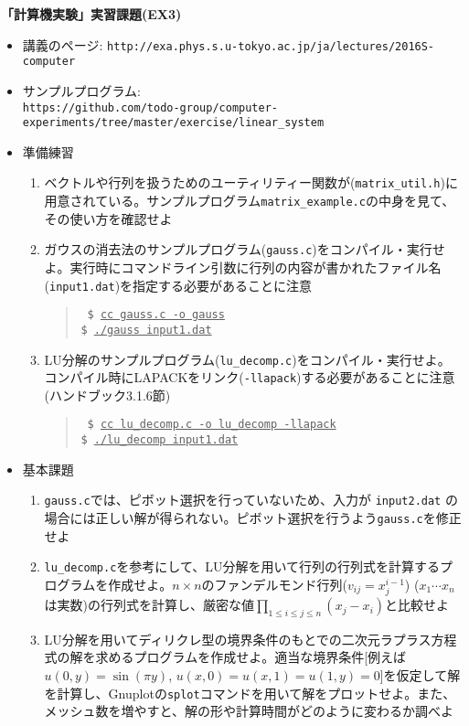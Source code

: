 \documentclass[11pt]{jarticle}
\begin{document}
\noindent
{\bf\large 「計算機実験」実習課題(EX3)}
\\[-0.5em]

\noindent
\begin{itemize}
\item 講義のページ: \verb+http://exa.phys.s.u-tokyo.ac.jp/ja/lectures/2016S-computer+

\item サンプルプログラム: \\ {\small \verb+https://github.com/todo-group/computer-experiments/tree/master/exercise/linear_system+}
  
\item 準備練習
  \begin{enumerate}
  \item ベクトルや行列を扱うためのユーティリティー関数が({\tt matrix\_util.h})に用意されている。サンプルプログラム{\tt matrix\_example.c}の中身を見て、その使い方を確認せよ
  \item ガウスの消去法のサンプルプログラム({\tt gauss.c})をコンパイル・実行せよ。実行時にコマンドライン引数に行列の内容が書かれたファイル名({\tt input1.dat})を指定する必要があることに注意
    \begin{quote} \tt
      \$ \underline{cc gauss.c -o gauss} \\
      \$ \underline{./gauss input1.dat}
    \end{quote}
  \item LU分解のサンプルプログラム({\tt lu\_decomp.c})をコンパイル・実行せよ。コンパイル時にLAPACKをリンク({\tt -llapack})する必要があることに注意(ハンドブック3.1.6節)
    \begin{quote} \tt
      \$ \underline{cc lu\_decomp.c -o lu\_decomp -llapack} \\
      \$ \underline{./lu\_decomp input1.dat}
    \end{quote}
  \end{enumerate}

\item 基本課題
  \begin{enumerate}
  \item {\tt gauss.c}では、ピボット選択を行っていないため、入力が {\tt input2.dat} の場合には正しい解が得られない。ピボット選択を行うよう{\tt gauss.c}を修正せよ
  \item {\tt lu\_decomp.c}を参考にして、LU分解を用いて行列の行列式を計算するプログラムを作成せよ。$n \times n$のファンデルモンド行列($v_{ij}=x_j^{i-1}$) ($x_1 \cdots x_n$は実数)の行列式を計算し、厳密な値$\displaystyle \prod_{1 \le i \le j \le n} (x_j-x_i)$と比較せよ
  \item LU分解を用いてディリクレ型の境界条件のもとでの二次元ラプラス方程式の解を求めるプログラムを作成せよ。適当な境界条件[例えば$u(0,y) = \sin(\pi y)$, $u(x,0)=u(x,1)=u(1,y)=0$]を仮定して解を計算し、Gnuplotの{\tt splot}コマンドを用いて解をプロットせよ。また、メッシュ数を増やすと、解の形や計算時間がどのように変わるか調べよ
  \end{enumerate}
  

\end{itemize}
\end{document}
